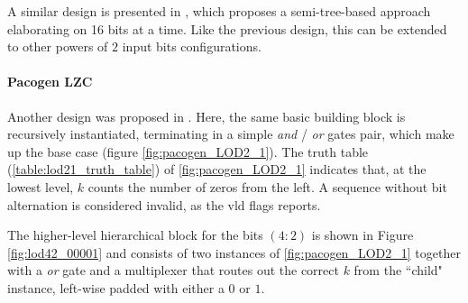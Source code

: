 A similar design is presented in \cite{dimitrakopoulos_low-power_2008}, which proposes a semi-tree-based approach elaborating on 16 bits at a time. Like the previous design, this can be extended to other powers of $2$ input bits configurations.

\paragraph{Pacogen LZC}

Another design was proposed in \cite{PACoGen}.
Here, the same basic building block is recursively instantiated, terminating in a simple \textit{and} / \textit{or} gates pair, which make up the base case (figure \ref{fig:pacogen_LOD2_1}).
The truth table (\ref{table:lod21_truth_table}) of \ref{fig:pacogen_LOD2_1} indicates that, at the lowest level, $k$ counts the number of zeros from the left. A sequence without bit alternation is considered invalid, as the $\text{vld}$ flags reports.

The higher-level hierarchical block for the bits $(4:2)$ is shown in Figure \ref{fig:lod42_00001} and consists of two instances of \ref{fig:pacogen_LOD2_1} together with a \textit{or} gate and a multiplexer that routes out the correct $k$ from the ``child" instance, left-wise padded with either a $0$ or $1$.

